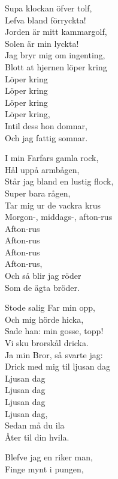 \vspace{10pt}
Supa klockan öfver tolf,\\
Lefva bland förryckta!\\
Jorden är mitt kammargolf,\\
Solen är min lyckta!\\
Jag bryr mig om ingenting,\\
Blott at hjernen löper kring\\
	Löper kring\\
	Löper kring\\
	Löper kring\\
	Löper kring,\\
Intil dess hon domnar,\\
Och jag fattig somnar.\par
\vspace{10pt}
I min Farfars gamla rock,\\
Hål uppå armbågen,\\
Står jag bland en lustig flock,\\
Super bara rågen,\\
Tar mig ur de vackra krus\\
Morgon-, middags-, afton-rus\\
	 Afton-rus\\
	 Afton-rus\\
	 Afton-rus\\
	 Afton-rus,\\
Och så blir jag röder\\
Som de ägta bröder.\par
\vspace{10pt}
Stode salig Far min opp,\\
Och mig hörde hicka,\\
Sade han: min gosse, topp!\\
Vi sku brorskål dricka.\\
Ja min Bror, så svarte jag:\\
Drick med mig til ljusan dag\\
	 Ljusan dag\\
	 Ljusan dag\\
	 Ljusan dag\\
	 Ljusan dag,\\
Sedan må du ila\\
Åter til din hvila.\par
\vspace{10pt}
Blefve jag en riker man,\\
Finge mynt i pungen,\\
